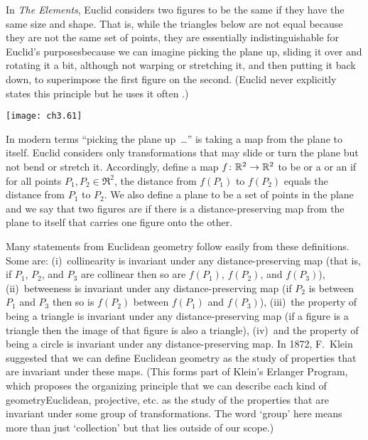 In \emph{The Elements}, Euclid considers two figures to be
the same if they have the same size and shape.
That is, while the triangles below are not equal because they are not the same 
set of points,
they are \Dash essentially 
indistinguishable
for Euclid's purposes\Dash because we can imagine 
picking the plane up,
sliding it over and rotating it a bit,
although not warping or stretching it,    
and then putting it back down, to superimpose the first figure on
the second.
(Euclid never explicitly states this principle 
but he uses it often \cite{Casey}.)
\begin{center}
  \texttt{[image: ch3.61]}
\end{center}
In modern terms ``picking the plane up~\ldots'' 
is taking a
map from the plane to itself. 
Euclid considers only transformations 
that may slide or turn the plane but not bend or stretch it.
Accordingly, define a map $\mbox{$f\colon \mathbb{R}^2\to \mathbb{R}^2$}$ to be 
%
or a  or an
if for all points $P_1,P_2\in\Re^2$,
the distance from $f(P_1)$ to $f(P_2)$ equals the distance from
$P_1$ to $P_2$. 
We also define a plane  
to be a set of points in the plane
and we say that two figures are 
%
 if there is a 
distance-preserving map from the plane to itself that carries one figure 
onto the other.

Many statements from Euclidean geometry 
follow easily from these definitions.
Some are: (i)~collinearity is invariant under any distance-preserving map
(that is, if $P_1$, $P_2$, and $P_3$ are collinear then so are
$f(P_1)$, $f(P_2)$, and $f(P_3)$),
(ii)~betweeness is invariant under any distance-preserving map
(if $P_2$ is between $P_1$ and $P_3$ then so is
$f(P_2)$ between $f(P_1)$ and $f(P_3)$),
(iii)~the property of being a triangle is invariant under 
any distance-preserving map 
(if a figure is a triangle then the image of that figure is also a triangle),
(iv)~and the property of being a circle is invariant under any
distance-preserving map.
In 1872, F.~Klein suggested that we can define 
Euclidean geometry as the study of properties that
are invariant under these maps.
(This forms part of Klein's Erlanger Program, 
which proposes the organizing principle that we can describe each kind of 
geometry\Dash Euclidean, projective, etc.\Dash 
as the study of the properties that are
invariant under some group of transformations.
The word `group' here means more than just `collection' 
but that lies outside of our scope.)

